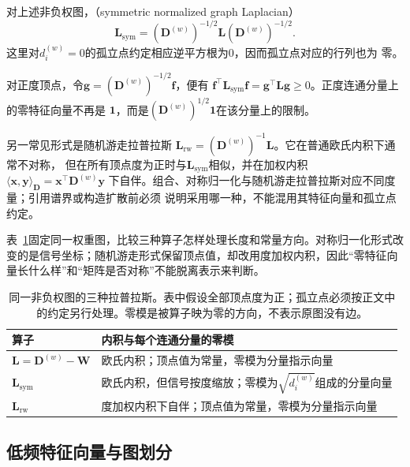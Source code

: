 \begin{definition}[对称归一化拉普拉斯]
\label{def:graph-theory-normalized-laplacian}
对上述非负权图，（symmetric normalized graph
Laplacian）
\begin{equation}
  \bm{L}_{\mathrm{sym}}
  =(\bm{D}^{(w)})^{-1/2}\bm{L}(\bm{D}^{(w)})^{-1/2}.
  \label{eq:graph-theory-normalized-laplacian}
\end{equation}
这里对\(d_i^{(w)}=0\)的孤立点约定相应逆平方根为\(0\)，因而孤立点对应的行列也为
零。
\end{definition}

对正度顶点，令\(\bm{g}=(\bm{D}^{(w)})^{-1/2}\bm{f}\)，便有
\(\bm{f}^{\top}\bm{L}_{\mathrm{sym}}\bm{f}
=\bm{g}^{\top}\bm{L}\bm{g}\geq0\)。正度连通分量上的零特征向量不再是
\(\bm{1}\)，而是\((\bm{D}^{(w)})^{1/2}\bm{1}\)在该分量上的限制。

另一常见形式是随机游走拉普拉斯
\(\bm{L}_{\mathrm{rw}}=(\bm{D}^{(w)})^{-1}\bm{L}\)。它在普通欧氏内积下通常不对称，
但在所有顶点度为正时与\(\bm{L}_{\mathrm{sym}}\)相似，并在加权内积
\(\langle\bm{x},\bm{y}\rangle_{\bm{D}}=\bm{x}^{\top}\bm{D}^{(w)}\bm{y}\)
下自伴。组合、对称归一化与随机游走拉普拉斯对应不同度量；引用谱界或构造扩散前必须
说明采用哪一种，不能混用其特征向量和孤立点约定。

表~\ref{tab:graph-theory-laplacian-geometries}固定同一权重图，比较三种算子怎样处理长度和常量方向。对称归一化形式改变的是信号坐标；随机游走形式保留顶点值，却改用度加权内积，因此“零特征向量长什么样”和“矩阵是否对称”不能脱离表示来判断。

\begin{table}[htbp]
 \centering\small
 \begin{tabularx}{\linewidth}{@{}lX@{}}
 \toprule
 算子 & 内积与每个连通分量的零模\\
 \midrule
 $\bm L=\bm D^{(w)}-\bm W$ & 欧氏内积；顶点值为常量，零模为分量指示向量\\
 $\bm L_{\mathrm{sym}}$ & 欧氏内积，但信号按度缩放；零模为$\sqrt{d_i^{(w)}}$组成的分量向量\\
 $\bm L_{\mathrm{rw}}$ & 度加权内积下自伴；顶点值为常量，零模为分量指示向量\\
 \bottomrule
 \end{tabularx}
 \caption{同一非负权图的三种拉普拉斯。表中假设全部顶点度为正；孤立点必须按正文中的约定另行处理。零模是被算子映为零的方向，不表示原图没有边。}
 \label{tab:graph-theory-laplacian-geometries}
\end{table}

\subsection{低频特征向量与图划分}

